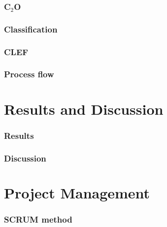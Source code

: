 \documentclass[xcolor=table]{beamer}
\begin{document}
\begin{frame} \frametitle{C$_2$O}

\end{frame}

\begin{frame} \frametitle{Classification}

\end{frame}

\begin{frame} \frametitle{CLEF}

\end{frame}

\begin{frame} \frametitle{Process flow}

\end{frame}

\section{Results and Discussion}
\begin{frame} \frametitle{Results}

\end{frame}

\begin{frame} \frametitle{Discussion}

\end{frame}

\section{Project Management}
\begin{frame} \frametitle{SCRUM method}

\end{frame}
\end{document}
